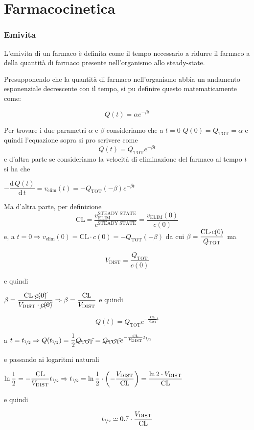 \part{Farmacocinetica}


\section{Emivita}

L'emivita di un farmaco è definita come il tempo necessario a ridurre
il farmaco a  della quantità di farmaco presente nell'organismo
allo steady-state.

Presupponendo che la quantità di farmaco nell'organismo abbia un andamento esponenziale decrescente con il tempo, si pu definire questo matematicamente come:

$$
Q(t)=\alpha e^{-\beta t}
$$

Per trovare i due parametri $\alpha$ e $\beta$ consideriamo che a $t=0$
$Q(0)=Q_{\text{TOT}}=\alpha$ e quindi l'equazione sopra si pro scrivere come
$$
Q(t)=Q_{\text{TOT}}e^{-\beta t}
$$
e d'altra parte se consideriamo la velocità di eliminazione del farmaco
al tempo $t$ si ha che\vspace{.5em}

$-\dfrac{\text{d}\,Q(t)}{\text{d}\,t}=v_{\text{elim}}(t)=-Q_{\text{TOT}}(-\beta)e^{-\beta t}$ \vspace{.5em}

Ma d'altra parte, per definizione
$$
\text{CL} = \dfrac{v_\text{ELIM}^\text{STEADY STATE}}{c^\text{STEADY STATE}} =\dfrac{v_\text{ELIM}(0)}{c(0)}
$$
e, a $t=0\Rightarrow v_{\text{elim}}(0)=\text{CL}\cdot c(0)=-Q_{\text{TOT}}(-\beta)$ da cui
$\beta=\dfrac{\text{CL\ensuremath{\cdot}}c(0)}{Q_{\text{TOT}}}$ ma

$$V_\text{DIST} = \dfrac{Q_{\text{TOT}}}{c(0)}$$ 

e quindi \vspace{.5em}

$\beta=\dfrac{\text{CL\ensuremath{\cdot}}\cancel{c(0)}}{V_{\text{DIST}}\cdot\cancel{c(0)}}\Rightarrow\beta=\dfrac{\text{CL}}{V_{\text{DIST}}}$ e quindi

$$
Q(t)=Q_{\text{TOT}}e^{-\frac{\text{CL}}{V_{\text{DIST}}}t}
$$


a $t=t_{\unitfrac{1}{2}}\Rightarrow Q(t_{\unitfrac{1}{2}})=\dfrac{1}{2}\cancel{Q_{\text{TOT}}}=\cancel{Q_{\text{TOT}}}e^{-\frac{\text{CL}}{V_{\text{DIST}}}t_{\unitfrac{1}{2}}}$ 

e passando ai logaritmi naturali

$\ln\dfrac{1}{2}=-\dfrac{\text{CL}}{V_{\text{DIST}}}t_{\unitfrac{1}{2}}\Rightarrow t_{\unitfrac{1}{2}}=\ln\dfrac{1}{2}\cdot\left(-\dfrac{V_{\text{DIST}}}{\text{CL}}\right)=\dfrac{\ln2\cdot V_{\text{DIST}}}{\text{CL}}$

e quindi

\[
t_{\unitfrac{1}{2}}\simeq0.7\cdot\dfrac{V_{\text{DIST}}}{\text{CL}}
\]

